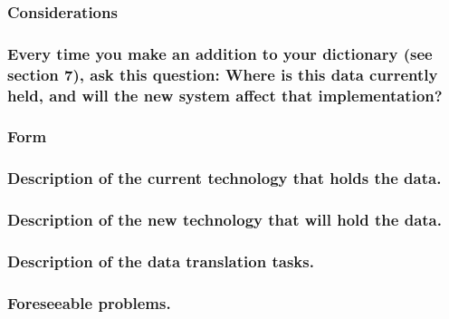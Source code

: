 \documentclass[
]{article}
\begin{document}
\hypertarget{considerations-53}{%
\subsubsection{Considerations}\label{considerations-53}}

\hypertarget{every-time-you-make-an-addition-to-your-dictionary-see-section-7-ask-this-question-where-is-this-data-currently-held-and-will-the-new-system-affect-that-implementation}{%
\subsubsection{Every time you make an addition to your dictionary (see
section 7), ask this question: Where is this data currently held, and
will the new system affect that
implementation?}\label{every-time-you-make-an-addition-to-your-dictionary-see-section-7-ask-this-question-where-is-this-data-currently-held-and-will-the-new-system-affect-that-implementation}}

\hypertarget{form-36}{%
\subsubsection{Form}\label{form-36}}

\hypertarget{description-of-the-current-technology-that-holds-the-data.}{%
\subsubsection{Description of the current technology that holds the
data.}\label{description-of-the-current-technology-that-holds-the-data.}}

\hypertarget{description-of-the-new-technology-that-will-hold-the-data.}{%
\subsubsection{Description of the new technology that will hold the
data.}\label{description-of-the-new-technology-that-will-hold-the-data.}}

\hypertarget{description-of-the-data-translation-tasks.}{%
\subsubsection{Description of the data translation
tasks.}\label{description-of-the-data-translation-tasks.}}

\hypertarget{foreseeable-problems.}{%
\subsubsection{Foreseeable problems.}\label{foreseeable-problems.}}
\end{document}
